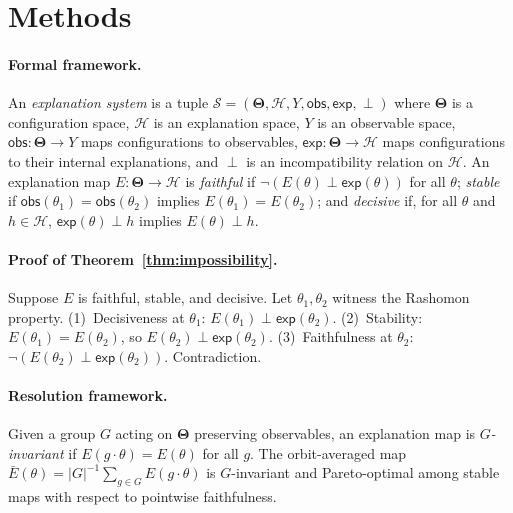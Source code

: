 \documentclass[11pt]{article}
\newcommand{\Params}{\mathbf{\Theta}}
\newcommand{\sH}{\mathcal{H}}
\newcommand{\incomp}{\perp}
\begin{document}

\section*{Methods}

\paragraph{Formal framework.}
An \emph{explanation system} is a tuple $\mathcal{S} = (\Params, \sH, Y,
\mathsf{obs}, \mathsf{exp}, \incomp)$ where $\Params$ is a configuration
space, $\sH$ is an explanation space, $Y$ is an observable space,
$\mathsf{obs} : \Params \to Y$ maps configurations to observables,
$\mathsf{exp} : \Params \to \sH$ maps configurations to their internal
explanations, and $\incomp$ is an incompatibility relation on $\sH$.
An explanation map $E : \Params \to \sH$ is \emph{faithful} if
$\lnot(E(\theta) \incomp \mathsf{exp}(\theta))$ for all $\theta$;
\emph{stable} if $\mathsf{obs}(\theta_1) = \mathsf{obs}(\theta_2)$ implies
$E(\theta_1) = E(\theta_2)$; and \emph{decisive} if, for all $\theta$ and
$h \in \sH$, $\mathsf{exp}(\theta) \incomp h$ implies $E(\theta) \incomp h$.

\paragraph{Proof of Theorem~\ref{thm:impossibility}.}
Suppose $E$ is faithful, stable, and decisive.  Let $\theta_1, \theta_2$
witness the Rashomon property.
(1)~Decisiveness at $\theta_1$: $E(\theta_1) \incomp \mathsf{exp}(\theta_2)$.
(2)~Stability: $E(\theta_1) = E(\theta_2)$, so $E(\theta_2) \incomp
\mathsf{exp}(\theta_2)$.
(3)~Faithfulness at $\theta_2$:
$\lnot(E(\theta_2) \incomp \mathsf{exp}(\theta_2))$.
Contradiction.

\paragraph{Resolution framework.}
Given a group $G$ acting on $\Params$ preserving observables,
an explanation map is \emph{$G$-invariant} if $E(g \cdot \theta) =
E(\theta)$ for all $g$.  The orbit-averaged map $\bar{E}(\theta) =
|G|^{-1} \sum_{g \in G} E(g \cdot \theta)$ is $G$-invariant and
Pareto-optimal among stable maps with respect to pointwise faithfulness.
\end{document}

